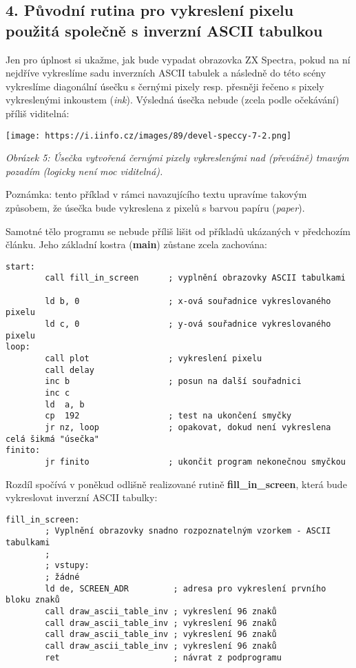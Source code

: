 \documentclass{article}
\renewcommand\includegraphics[2][]{}
\begin{document}
\hypertarget{k04}{%
\subsection{4. Původní rutina pro vykreslení pixelu použitá společně s
inverzní ASCII tabulkou}\label{k04}}

Jen pro úplnost si ukažme, jak bude vypadat obrazovka ZX Spectra, pokud
na ní nejdříve vykreslíme sadu inverzních ASCII tabulek a následně do
této scény vykreslíme diagonální úsečku s černými pixely resp. přesněji
řečeno s pixely vykreslenými inkoustem (\emph{ink}). Výsledná úsečka
nebude (zcela podle očekávání) příliš viditelná:

\texttt{[image: https://i.iinfo.cz/images/89/devel-speccy-7-2.png]}

\emph{Obrázek 5: Úsečka vytvořená černými pixely vykreslenými nad
(převážně) tmavým pozadím (logicky není moc viditelná).}

Poznámka: tento příklad v rámci navazujícího textu upravíme takovým
způsobem, že úsečka bude vykreslena z pixelů s barvou papíru
(\emph{paper}).

Samotné tělo programu se nebude příliš lišit od příkladů ukázaných v
předchozím článku. Jeho základní kostra (\textbf{main}) zůstane zcela
zachována:

\begin{verbatim}
start:
        call fill_in_screen      ; vyplnění obrazovky ASCII tabulkami
 
        ld b, 0                  ; x-ová souřadnice vykreslovaného pixelu
        ld c, 0                  ; y-ová souřadnice vykreslovaného pixelu
loop:
        call plot                ; vykreslení pixelu
        call delay
        inc b                    ; posun na další souřadnici
        inc c
        ld  a, b
        cp  192                  ; test na ukončení smyčky
        jr nz, loop              ; opakovat, dokud není vykreslena celá šikmá "úsečka"
finito:
        jr finito                ; ukončit program nekonečnou smyčkou
\end{verbatim}

Rozdíl spočívá v poněkud odlišně realizované rutině
\textbf{fill\_in\_screen}, která bude vykreslovat inverzní ASCII
tabulky:

\begin{verbatim}
fill_in_screen:
        ; Vyplnění obrazovky snadno rozpoznatelným vzorkem - ASCII tabulkami
        ;
        ; vstupy:
        ; žádné
        ld de, SCREEN_ADR         ; adresa pro vykreslení prvního bloku znaků
        call draw_ascii_table_inv ; vykreslení 96 znaků
        call draw_ascii_table_inv ; vykreslení 96 znaků
        call draw_ascii_table_inv ; vykreslení 96 znaků
        call draw_ascii_table_inv ; vykreslení 96 znaků
        ret                       ; návrat z podprogramu
\end{verbatim}
\end{document}
